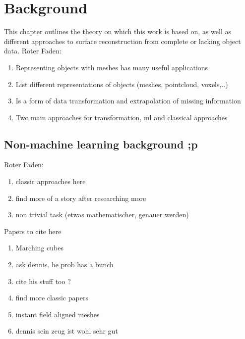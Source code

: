 \chapter{Background}
\label{sec:background}
This chapter outlines the theory on which this work is based on, as well as different approaches to surface reconstruction from complete or lacking object data.
Roter Faden:
\begin{enumerate}
  \item Representing objects with meshes has many useful applications
  \item List different representations of objects (meshes, pointcloud, voxels,..)
  \item Is a form of data transformation and extrapolation of missing information
  \item Two main approaches for transformation, ml and classical approaches
\end{enumerate}

\section{Non-machine learning background ;p}
Roter Faden:
\begin{enumerate}
  \item classic approaches here
  \item find more of a story after researching more
  \item non trivial task  (etwas mathematischer, genauer werden)
\end{enumerate}
Papers to cite here
\begin{enumerate}
  \item Marching cubes
  \item ask dennis. he prob has a bunch
  \item cite his stuff too ?
  \item find more classic papers
  \item instant field aligned meshes
  \item dennis sein zeug ist wohl sehr gut
\end{enumerate}


